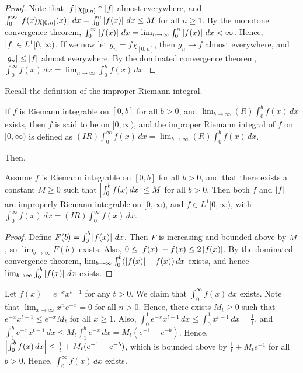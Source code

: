 \begin{proof}
    Note that $\left| f \right|\chi_{[0,n]} \uparrow \left| f \right|$ almost everywhere, and $\int_{0}^{\infty} \left| f(x) \chi_{[0,n]}(x) \right| \, dx = \int_{0}^{n} \left| f(x) \right| \, dx \leq M$ for all $n \geq 1$. By the monotone convergence theorem, $\int_{0}^{\infty} \left| f(x) \right| \, dx = \lim_{n \to \infty} \int_{0}^{n} \left| f(x) \right| \, dx < \infty$. Hence, $\left| f \right| \in L^{1}[0,\infty)$. If we now let $g_{n} = f \chi_{[0,n]}$, then $g_{n} \to f$ almost everywhere, and $\left| g_{n} \right| \leq \left| f \right|$ almost everywhere. By the dominated convergence theorem, $\int_{0}^{\infty} f(x) \, dx = \lim_{n \to \infty} \int_{0}^{n} f(x) \, dx$.
\end{proof}


Recall the definition of the improper Riemann integral.
\begin{definition}
    If $f$ is Riemann integrable on $[0,b]$ for all $b > 0$, and $\lim_{b \to \infty} (R)\int_{0}^{b} f(x) \, dx$ exists, then $f$ is said to be  on $[0,\infty)$, and the improper Riemann integral of $f$ on $[0,\infty)$ is defined as $(IR)\int_{0}^{\infty} f(x) \, dx = \lim_{b \to \infty} (R)\int_{0}^{b} f(x) \, dx$.
\end{definition}

Then,
\begin{theorem}
    Assume $f$ is Riemann integrable on $[0,b]$ for all $b > 0$, and that there exists a constant $M \geq 0$ such that $\left| \int_{0}^{b} f(x) \, dx \right| \leq M$ for all $b > 0$. Then both $f$ and $\left| f \right|$ are improperly Riemann integrable on $[0,\infty)$, and $f \in L^{1}[0,\infty)$, with $\int_{0}^{\infty} f(x) \, dx = (IR)\int_{0}^{\infty} f(x) \, dx$.
\end{theorem}

\begin{proof}
    Define $F(b) = \int_{0}^{b} \left| f(x) \right| \, dx$. Then $F$ is increasing and bounded above by $M$, so $\lim_{b \to \infty} F(b)$ exists. Also, $0 \leq \left| f(x) \right| - f(x) \leq 2\left| f(x) \right|$. By the dominated convergence theorem, $\lim_{b \to \infty} \int_{0}^{b} (\left| f(x) \right|-f(x)) \, dx$ exists, and hence $\lim_{b \to \infty} \int_{0}^{b} \left| f(x) \right| \, dx$ exists.
\end{proof}

\begin{example}
    Let $f(x) = e^{-x}x^{t-1}$ for any $t > 0$. We claim that $\int_{0}^{\infty} f(x) \, dx$ exists. Note that $\lim_{x \to \infty} x^{n} e^{-x} = 0$ for all $n > 0$. Hence, there exists $M_{t} \geq 0$ such that $e^{-x}x^{t-1} \leq e^{-x}M_{t}$ for all $x \geq 1$. Also, $\int_{0}^{1} e^{-x}x^{t-1} \, dx \leq \int_{0}^{1} x^{t-1} \, dx = \frac{1}{t}$, and $\int_{1}^{b} e^{-x}x^{t-1} \, dx \leq M_{t}\int_{1}^{b} e^{-x} \, dx = M_{t}(e^{-1}-e^{-b})$. Hence, $\left| \int_{0}^{b} f(x) \, dx \right| \leq \frac{1}{t}+M_{t}(e^{-1}-e^{-b})$, which is bounded above by $\frac{1}{t}+M_{t}e^{-1}$ for all $b > 0$. Hence, $\int_{0}^{\infty} f(x) \, dx$ exists.
\end{example}

